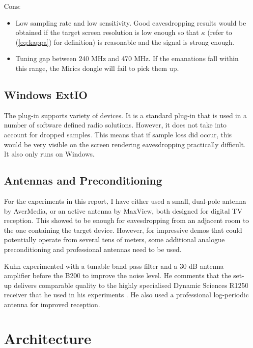 \documentclass[a4paper,12pt,twoside,openright]{report}
\begin{document}
Cons:
\begin{itemize}
	\item Low sampling rate and low sensitivity. Good eavesdropping results would be obtained if the target screen resolution is low enough so that $\kappa$ (refer to (\ref{eq:kappa}) for definition) is reasonable and the signal is strong enough.
	\item Tuning gap between 240 MHz and 470 MHz. If the emanations fall within this range, the Mirics dongle will fail to pick them up.
\end{itemize}

\subsection{Windows ExtIO}

The plug-in supports variety of devices. It is a standard plug-in that is used in a number of software defined radio solutions. However, it does not take into account for dropped samples. This means that if sample loss did occur, this would be very visible on the screen rendering eavesdropping practically difficult. It also only runs on Windows.

\subsection{Antennas and Preconditioning}

For the experiments in this report, I have either used a small, dual-pole antenna by AverMedia, or an active antenna by MaxView, both designed for digital TV reception. This showed to be enough for eavesdropping from an adjacent room to the one containing the target device. However, for impressive demos that could potentially operate from several tens of meters, some additional analogue preconditioning and professional antennas need to be used.

Kuhn experimented with a tunable band pass filter and a 30 dB antenna amplifier before the B200 to improve the noise level. He comments that the set-up delivers comparable quality to the highly specialised Dynamic Sciences R1250 receiver that he used in his experiments \cite{kuhn2003compromising}. He also used a professional log-periodic antenna for improved reception.

\section{Architecture}
\end{document}
